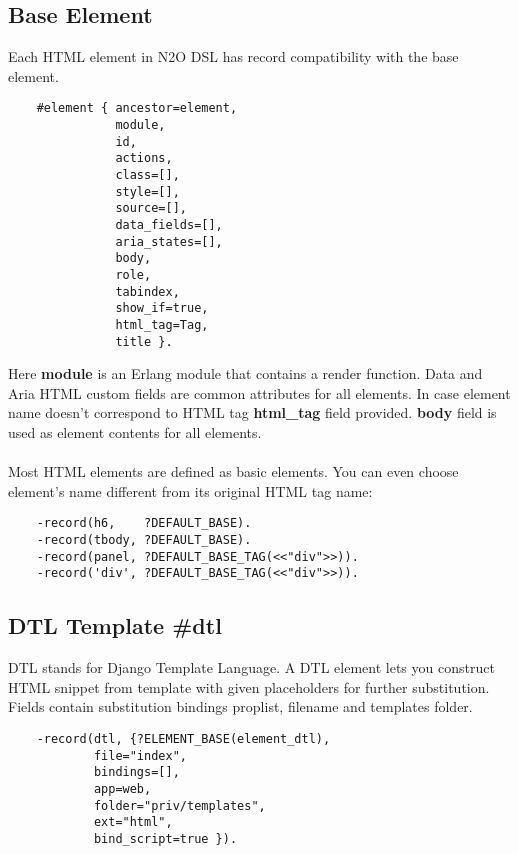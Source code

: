 \newpage
\subsection{Base Element}
Each HTML element in N2O DSL has record compatibility with the base element.

\vspace{1\baselineskip}
\begin{lstlisting}
    #element { ancestor=element,
               module,
               id,
               actions,
               class=[],
               style=[],
               source=[],
               data_fields=[],
               aria_states=[],
               body,
               role,
               tabindex,
               show_if=true,
               html_tag=Tag,
               title }.
\end{lstlisting}
\vspace{1\baselineskip}

Here {\bf module} is an Erlang module that contains a render function.
Data and Aria HTML custom fields are common attributes for all elements.
In case element name doesn't correspond to HTML tag {\bf html\_tag} field provided.
{\bf body} field is used as element contents for all elements.

\paragraph{}
Most HTML elements are defined as basic elements. You can even choose element's
name different from its original HTML tag name:

\vspace{1\baselineskip}
\begin{lstlisting}
    -record(h6,    ?DEFAULT_BASE).
    -record(tbody, ?DEFAULT_BASE).
    -record(panel, ?DEFAULT_BASE_TAG(<<"div">>)).
    -record('div', ?DEFAULT_BASE_TAG(<<"div">>)).
\end{lstlisting}
\vspace{1\baselineskip}

\newpage
\subsection{DTL Template {\bf \#dtl}}
DTL stands for Django Template Language. A DTL element lets you construct HTML
snippet from template with given placeholders for further substitution.
Fields contain substitution bindings proplist, filename and templates folder.

\vspace{1\baselineskip}
\begin{lstlisting}
    -record(dtl, {?ELEMENT_BASE(element_dtl),
            file="index",
            bindings=[],
            app=web,
            folder="priv/templates",
            ext="html",
            bind_script=true }).
\end{lstlisting}
\vspace{1\baselineskip}

